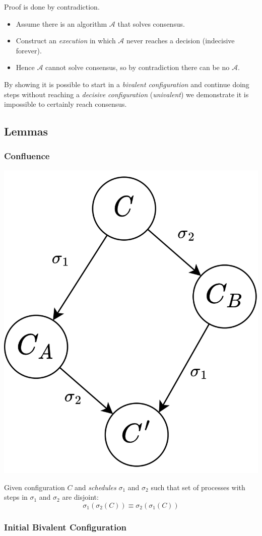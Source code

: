 Proof is done by contradiction.
\begin{itemize}
    \item Assume there is an algorithm $\mathcal{A}$ that solves consensus.
    \item Construct an \textit{execution} in which $\mathcal{A}$ never reaches a decision (indecisive forever).
    \item Hence $\mathcal{A}$ cannot solve consensus, so by contradiction there can be no $\mathcal{A}$. 
\end{itemize}
By showing it is possible to start in a \textit{bivalent configuration} and continue doing steps without reaching a \textit{decisive configuration} (\textit{univalent}) we demonstrate it is impossible to certainly reach consensus.

\subsection{Lemmas}
\subsubsection{Confluence}
\begin{center}
    \includegraphics[width=.3\textwidth]{consensus/images/lemma_confluence.drawio.png}
\end{center}
Given configuration $C$ and \textit{schedules} $\sigma_1$ and $\sigma_2$ such that set of processes with steps in $\sigma_1$ and $\sigma_2$ are disjoint:
\[\sigma_1(\sigma_2(C)) \equiv \sigma_2(\sigma_1(C))\]

\subsubsection{Initial Bivalent Configuration}
\unfinished

